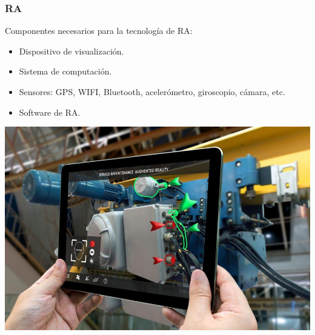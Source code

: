 \begin{frame}
	\frametitle{RA}
			Componentes necesarios para la tecnología de RA:
			\begin{itemize}
				\item {Dispositivo de visualización.}
				\item {Sistema de computación.}
				\item {Sensores: GPS, WIFI, Bluetooth, acelerómetro, giroscopio, cámara, etc.}
				\item {Software de RA.}
			\end{itemize}
		\endblock{}

		\begin{center}
			\includegraphics[width=0.43\linewidth]{Images/ar1}
		\end{center}
\end{frame}
		


